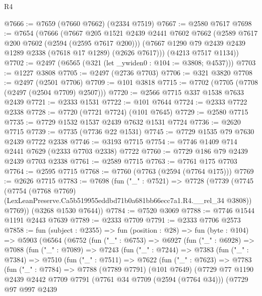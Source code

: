 \begin{lexlean}{R4}
\begin{coremodule}
@7666 := @7659 (@7660 @7662) (@2334 @7519)
@7667 := @2580 @7617
@7698 := @7654
    (@7666
      (@7667
        @205
        @1521
        @2439
        @2441
        @7602
        @7662
        (@2589 @7617 @200 @7602 (@2594 (@2595 @7617 @200)))
        (@7667 @1290 @79 @2439 @2439 @1289 @2338 (@7618 @17 @1289) (@2626 @7617)))
      (@4213 @7517 @1134))
@7702 := @2497 (@6565 (@321 (let _ywiden0 : @104 := @3808; @4537)))
@7703 := @1227 @3808
@7705 := @2497 (@2736 @7703)
@7706 := @321 @3820
@7708 := @2497 (@2501 @7706)
@7709 := @101 @3818
@7715 := @7702 (@7705 (@7708 (@2497 (@2504 @7709) @2507)))
@7720 := @2566 @7715 @337 @1538 @7633 @2439
@7721 := @2333 @1531
@7722 := @101 @7644
@7724 := @2333 @7722 @2338
@7728 := @7720 (@7721 @7724) (@101 @7645)
@7729 := @2580 @7715
@7735 := @7729 @1532 @1537 @2439 @7632 @1531 @7724
@7736 := @2620 @7715
@7739 := @7735 (@7736 @22 @1531)
@7745 := @7729 @1535 @79 @7630 @2439 @7722 @2338
@7746 := @3193 @7715
@7754 := @7746 @1409 @714 @2441 @7629 (@2333 @7703 @2338) @7722
@7760 := @7729 @186 @79 @2439 @2439 @7703 @2338
@7761 := @2589 @7715
@7763 := @7761 @175 @7703
@7764 := @2595 @7715
@7768 := @7760 (@7763 (@2594 (@7764 @175)))
@7769 := @2626 @7715
@7783 := @7698
    (fun ("_" : @7521) =>
    @7728
      (@7739
        (@7745
          (@7754
            (@7768 @7769)
            (LexLeanPreserve.Ca5b519955eddbd71b0a681bb66ecc7a1.R4.__rel_34 @3808))
          @7769))
      (@3268 @1530 @7644))
@7784 := @7520 @3069
@7788 := @7746 @1544 @1191 @2443 @7639
@7789 := @2333 @7709
@7791 := @2333 @7706 @2573
@7858 := fun (subject : @2355) =>
  fun (position : @28) =>
  fun (byte : @104) =>
  @5903
    (@6564
      (@6752
        (fun ("_" : @6753) =>
        @6927
          (fun ("_" : @6928) =>
          @7088
            (fun ("_" : @7089) =>
            @7243
              (fun ("_" : @7244) =>
              @7383
                (fun ("_" : @7384) =>
                @7510
                  (fun ("_" : @7511) =>
                  @7622
                    (fun ("_" : @7623) =>
                    @7783
                      (fun ("_" : @7784) =>
                      @7788
                        (@7789 @7791)
                        (@101 @7649)
                        (@7729
                          @77
                          @1190
                          @2439
                          @2442
                          @7709
                          @7791
                          (@7761 @34 @7709 (@2594 (@7764 @34)))
                          (@7729
                            @97
                            @997
                            @2439

\end{coremodule}
\end{lexlean}
